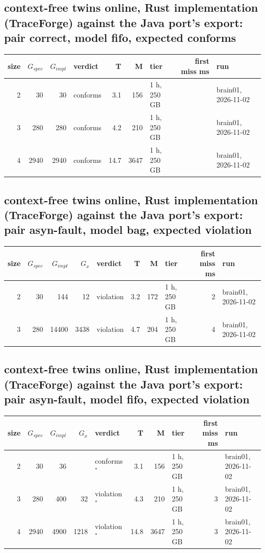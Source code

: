\documentclass[10pt]{article}
\begin{document}
\subsection*{context-free twins online, Rust implementation (TraceForge) against the Java port's export: pair \textsf{correct}, model fifo, expected conforms}
\begin{longtable}{@{}rrrlrrlrl@{}}
\toprule
size & $G_{\mathit{spec}}$ & $G_{\mathit{impl}}$ & verdict & T & M & tier & first miss ms & run \\
\midrule
\endhead
\color{red} 2 & 30 & 30 & conforms & 3.1 & 156 & 1 h, 250 GB &  & brain01, 2026-11-02 \\
\color{red} 3 & 280 & 280 & conforms & 4.2 & 210 & 1 h, 250 GB &  & brain01, 2026-11-02 \\
\color{red} 4 & 2940 & 2940 & conforms & 14.7 & 3647 & 1 h, 250 GB &  & brain01, 2026-11-02 \\
\bottomrule
\end{longtable}
\subsection*{context-free twins online, Rust implementation (TraceForge) against the Java port's export: pair \textsf{asyn-fault}, model bag, expected violation}
\begin{longtable}{@{}rrrrlrrlrl@{}}
\toprule
size & $G_{\mathit{spec}}$ & $G_{\mathit{impl}}$ & $G_x$ & verdict & T & M & tier & first miss ms & run \\
\midrule
\endhead
\color{red} 2 & 30 & 144 & 12 & violation & 3.2 & 172 & 1 h, 250 GB & 2 & brain01, 2026-11-02 \\
\color{red} 3 & 280 & 14400 & 3438 & violation & 4.7 & 204 & 1 h, 250 GB & 4 & brain01, 2026-11-02 \\
\bottomrule
\end{longtable}
\subsection*{context-free twins online, Rust implementation (TraceForge) against the Java port's export: pair \textsf{asyn-fault}, model fifo, expected violation}
\begin{longtable}{@{}rrrrlrrlrl@{}}
\toprule
size & $G_{\mathit{spec}}$ & $G_{\mathit{impl}}$ & $G_x$ & verdict & T & M & tier & first miss ms & run \\
\midrule
\endhead
\color{red} 2 & 30 & 36 &  & conforms$^{\ast}$ & 3.1 & 156 & 1 h, 250 GB &  & brain01, 2026-11-02 \\
\color{red} 3 & 280 & 400 & 32 & violation$^{\ast}$ & 4.3 & 210 & 1 h, 250 GB & 3 & brain01, 2026-11-02 \\
\color{red} 4 & 2940 & 4900 & 1218 & violation$^{\ast}$ & 14.8 & 3647 & 1 h, 250 GB & 3 & brain01, 2026-11-02 \\
\bottomrule
\end{longtable}
\end{document}
